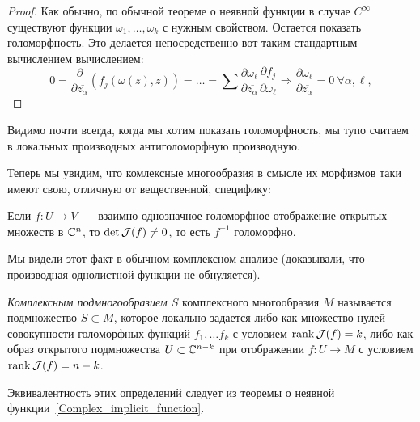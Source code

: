     \begin{proof}
        Как обычно, по обычной теореме о неявной функции в случае $C^{\infty}$ существуют функции $\omega_{1}, \ldots, \omega_{k}$ с нужным свойством.
        Остается показать голоморфность. Это делается непосредственно вот таким стандартным вычислением вычислением:
        \[ 0 = \frac{\partial}{\partial \overline{z_{\alpha}} } (f_{j}(\omega(z), z)) = \ldots = \sum \frac{\partial \omega_{\ell}}{\partial \overline{z_{\alpha}}} \frac{\partial f_{j}}{\partial \omega_{\ell}} \Rightarrow \frac{\partial \omega_{\ell}}{\partial \overline{z_{\alpha}}} = 0 \ \forall \alpha, \ell, \]
    \end{proof}
    
    \begin{remark}
       Видимо почти всегда, когда мы хотим показать голоморфность, мы тупо считаем в локальных производных антиголоморфную производную.
    \end{remark}

    Теперь мы увидим, что комлексные многообразия в смысле их морфизмов таки имеют свою, отличную от вещественной, специфику:

    \begin{statement}
        Если $f\colon U \to V$~--- взаимно однозначное голоморфное отображение открытых множеств в $\mathbb{C}^n$, то
        $\det{\mathcal{J}(f)} \neq 0$, то есть $f^{-1}$ голоморфно.
    \end{statement}

    \begin{remark}
       Мы видели этот факт в обычном  комплексном анализе (доказывали, что производная однолистной функции не обнуляется).
    \end{remark}

    \begin{definition}
        \emph{Комплексным подмногообразием $S$} комплексного многообразия $M$ называется подмножество $S \subset M$,  которое локально задается либо как множество нулей
        совокупности голоморфных функций $f_{1}, \ldots f_{k}$ с условием $\operatorname{rank}{\mathcal{J}(f)} = k$, либо как образ открытого подмножества
        $U \subset \mathbb{C}^{n - k}$ при отображении $f\colon U \to M$ с условием $\operatorname{rank}{\mathcal{J}(f)} = n - k$.
    \end{definition}
    
    Эквивалентность этих определений следует из теоремы о неявной функции~\ref{Complex_implicit_function}.
    
